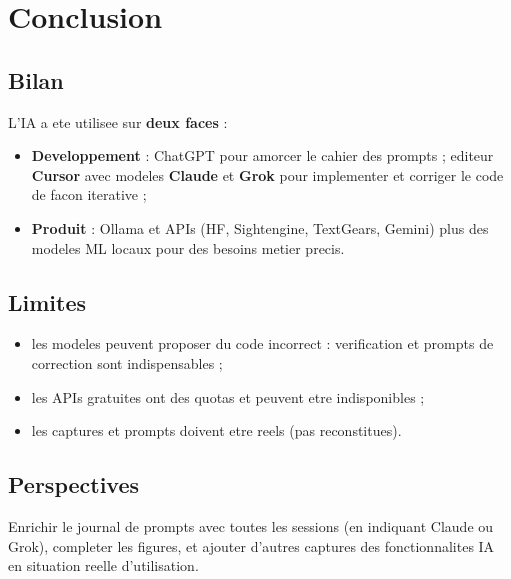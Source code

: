 \chapter{Conclusion}
\label{ch:conclusion}

\section{Bilan}

L'IA a ete utilisee sur \textbf{deux faces} :
\begin{itemize}
  \item \textbf{Developpement} : ChatGPT pour amorcer le cahier des prompts ;
        editeur \textbf{Cursor} avec modeles \textbf{Claude} et \textbf{Grok}
        pour implementer et corriger le code de facon iterative ;
  \item \textbf{Produit} : Ollama et APIs (HF, Sightengine, TextGears, Gemini)
        plus des modeles ML locaux pour des besoins metier precis.
\end{itemize}

\section{Limites}

\begin{itemize}
  \item les modeles peuvent proposer du code incorrect : verification et prompts
        de correction sont indispensables ;
  \item les APIs gratuites ont des quotas et peuvent etre indisponibles ;
  \item les captures et prompts doivent etre reels (pas reconstitues).
\end{itemize}

\section{Perspectives}

Enrichir le journal de prompts avec toutes les sessions (en indiquant Claude ou
Grok), completer les figures, et ajouter d'autres captures des fonctionnalites
IA en situation reelle d'utilisation.
